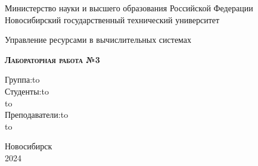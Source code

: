 \documentclass[a4paper,12pt]{article} %
\begin{document}
\begin{titlepage}
\newpage

\begin{center}
Министерство науки и высшего образования Российской Федерации \\
Новосибирский государственный технический университет
\end{center}

\vspace{8em}

\begin{center}
\Large Управление ресурсами в вычислительных системах \\ 
\end{center}

\vspace{2em}

\begin{center}
\textsc{\textbf{Лабораторная работа №3}}
\end{center}

\vspace{6em}



\newbox{\lbox}
\newlength{\maxl}
\setlength{\maxl}{\wd\lbox}
\hfill\parbox{11cm}{
\hspace*{5cm}\hspace*{-5cm}Группа:\hfill\hbox to\\
\hspace*{5cm}\hspace*{-5cm}Студенты:\hfill\hbox to\\
\hspace*{5cm}\hspace*{-5cm}\hfill\hbox to\\
\hspace*{5cm}\hspace*{-5cm}Преподаватели:\hfill\hbox to\\
\hspace*{5cm}\hspace*{-5cm}\hfill\hbox to\\
}


\vspace{\fill}

\begin{center}
Новосибирск \\2024
\end{center}

\end{titlepage}
\end{document}
